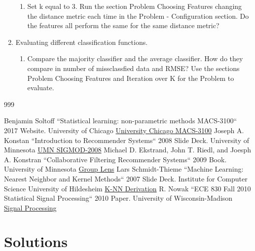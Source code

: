 \documentclass{report}
\begin{document}
\begin{enumerate}
\begin{enumerate}
	\item {
	Set k equal to 3.
	Run the section Problem Choosing Features changing the distance metric each time in the Problem - Configuration section.
	Do the features all perform the same for the same distance metric?
	}
	
	\end{enumerate}


\item {
Evaluating different classification functions.
}
    \begin{enumerate}
	
	\item {
	Compare the majority classifier and the average classifier. How do they compare in number of missclassfied data and RMSE? 
	Use the sections Problem Choosing Features and Iteration over K for the Problem to evaluate.
	}    
    \end{enumerate}
    
\end{enumerate}

\begin {thebibliography}{999}

	Benjamin Soltoff
  ``Statistical learning: non-parametric methods MACS-3100``
  2017 Website.
  University of Chicago 
	\href{https://cfss.uchicago.edu/persp010_nonparametric.html#objectives}{University Chicago MACS-3100}
	Joseph A. Konstan
  ``Introduction to Recommender Systems`` 2008 Slide Deck.
  University of Minnesota
	\href{https://www-users.cs.umn.edu/~konstan/SIGMOD-2008-Tut.pdf}{UMN SIGMOD-2008}
	Michael D. Ekstrand, John T. Riedl, and Joesph A. Konstran
	``Collaborative Filtering Recommender Systems``
		2009 Book.
	University of Minnesota
	 \href{http://files.grouplens.org/papers/FnT%20CF%20Recsys%20Survey.pdf} {Group Lens}
	Lars Schmidt-Thieme
	``Machine Learning: Nearest Neighbor and Kernel Methods``
	2007 Slide Deck.
	Institute for Computer Science University of Hildesheim
	 \href{https://www.ismll.uni-hildesheim.de/lehre/ml-07w/skript/ml-2up-03-nearest-neighbor.pdf} {K-NN Derivation}
	 R. Nowak
	 ``ECE 830 Fall 2010 Statistical Signal Processing``
	 2010 Paper.
	 University of Wisconsin-Madison
	 \href{http://nowak.ece.wisc.edu/ece830/ece830_lecture24.pdf}{Signal Processing}
\end{thebibliography}

\chapter*{Solutions}
\end{document}
